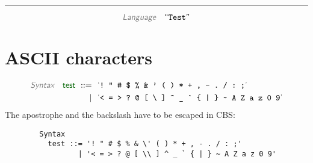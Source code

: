 

\begin{center}
\rule{3in}{0.4pt}
\end{center}

\begin{displaymath}
\KEY{Language} \quad \STRING{Test}
\end{displaymath}

\section{ASCII characters}\hypertarget{ascii-characters}{}\label{ascii-characters}

\begin{align*}
  \KEY{Syntax} \quad
     \SYN{test}
      \ ::= \ & \
      \LEX{{!}~{"}~{\HASH}~{\DOLLAR}~{\PERCENT}~{\AMPERSAND}~{\APOSTROPHE}~{(}~{)}~{*}~{+}~{,}~{-}~{.}~{/}~{:}~{;}} \\
      \ \mid \ & \ \LEX{{<}~{=}~{>}~{?}~{@}~{[}~{\BACKSLASH}~{]}~{\CARET}~{\UNDERSCORE}~{\GRAVE}~{\LEFTBRACE}~{|}~{\RIGHTBRACE}~{\TILDE}~A~Z~a~z~0~9}
\end{align*}
The apostrophe and the backslash have to be escaped in CBS:

\begin{verbatim}        Syntax
          test ::= '! " # $ % & \' ( ) * + , - . / : ;'
                 | '< = > ? @ [ \\ ] ^ _ ` { | } ~ A Z a z 0 9'
\end{verbatim}

